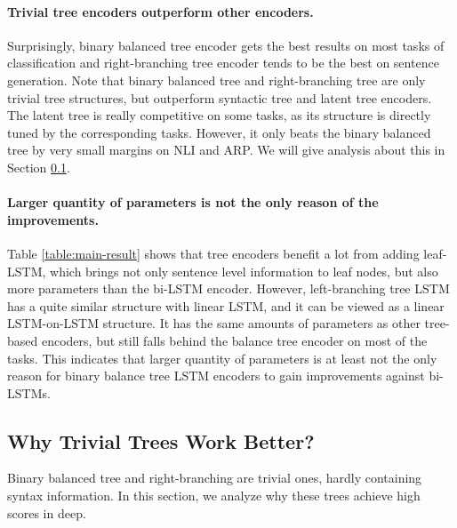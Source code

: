 \documentclass[11pt,a4paper]{article}
\begin{document}
\paragraph{Trivial tree encoders outperform other encoders.}
Surprisingly, binary balanced tree encoder gets the best results on most tasks of classification and right-branching tree encoder tends to be the best on sentence generation.
Note that binary balanced tree and right-branching tree are only trivial tree structures, but outperform syntactic tree and latent tree encoders.
The latent tree is really competitive on some tasks, as its  structure is directly tuned by the corresponding tasks.
However, it only beats the binary balanced tree by very small margins on NLI and ARP.
We will give analysis about this in Section \ref{sec:trivial}.


\paragraph{Larger quantity of parameters is not the only reason of the improvements.}
Table \ref{table:main-result} shows that tree encoders benefit a lot from adding leaf-LSTM, which brings not only sentence level information to leaf nodes, but also more parameters than the bi-LSTM encoder.
However, left-branching tree LSTM has a quite similar structure with linear LSTM, and it can be viewed as a linear LSTM-on-LSTM structure. 
It has the same amounts of parameters as other tree-based encoders, but still falls behind the balance tree encoder on most of the tasks.
This indicates that larger quantity of parameters is at least not the only reason for binary balance tree LSTM encoders to gain improvements against bi-LSTMs.

 
\subsection{Why Trivial Trees Work Better?}
\label{sec:trivial}


Binary balanced tree and right-branching are trivial ones, hardly containing syntax information.
In this section, we analyze why these trees achieve high scores in deep. 
\end{document}

